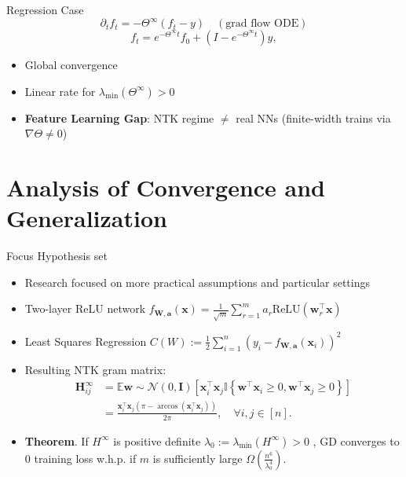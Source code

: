 \documentclass[serif, aspectratio=169]{beamer}
\newcommand{\relu}{\text{ReLU}}
\newcommand{\E}{\mathbb{E}}
\begin{document}
\begin{frame}{Regression Case}
	\[
	\partial_t f_t = -\Theta^\infty(f_t - y) \quad (\text{grad flow ODE})
	\]
	\[
	f_t = e^{-\Theta^\infty t} f_0 + \left(I - e^{-\Theta^\infty t}\right) y,
	\]
	
	\begin{itemize}
		\item Global convergence
		\item Linear rate for \(\lambda_{\min}(\Theta^\infty) > 0\)
		\item \textbf{Feature Learning Gap}: NTK regime \(\neq\) real NNs (finite-width trains via \(\nabla\Theta \neq 0\))
	\end{itemize}
\end{frame}

\section{Analysis of Convergence and Generalization}

\begin{frame}{Focus Hypothesis set}
	\begin{itemize}
		\item Research focused on more practical assumptions and particular settings
		\item Two-layer ReLU network \(f_{\mathbf{W},\mathbf{a}}(\mathbf{x}) = \frac{1}{\sqrt{m}}\sum_{r=1}^{m} a_r \relu(\mathbf{w}_r^\top \mathbf{x})
		\)
		\item Least Squares Regression \(C(W):=\frac{1}{2}\sum_{i=1}^{n}(y_i - f_{\mathbf{W},\mathbf{a}}(\mathbf{x}_i))^2\)
		\item Resulting NTK gram matrix:
		\begin{align*}
			\mathbf{H}_{ij}^\infty &= \E{\mathbf{w} \sim \mathcal{N}(0,\mathbf{I})}\left[ \mathbf{x}_i^\top \mathbf{x}_j\mathbb{I}\left\{\mathbf{w}^\top \mathbf{x}_i \ge 0, \mathbf{w}^\top \mathbf{x}_j \ge 0\right\}\right] \\
			&= \frac{\mathbf{x}_i^\top\mathbf{x}_j\left(\pi - \arccos(\mathbf{x}_i^\top\mathbf{x}_j)\right)}{2\pi}, \quad \forall i, j\in[n].
		\end{align*}
		\item \textbf{Theorem}. If \(H^\infty\) is positive
		definite \(\lambda_0 := \lambda_{\min}(H^{\infty})>0\) , 
		GD converges to \(0\) training loss w.h.p. if \(m\) is sufficiently large \(\Omega(\frac{n^6}{\lambda_0^4})\).
	\end{itemize}
\end{frame}
\end{document}
